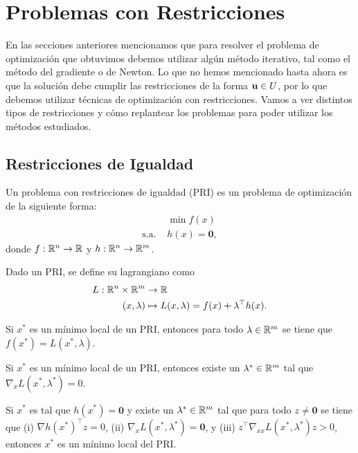 
\section{Problemas con Restricciones}

En las secciones anteriores mencionamos que para resolver el problema de optimización que obtuvimos debemos utilizar algún método iterativo, tal como el método del gradiente o de Newton. Lo que no hemos mencionado hasta ahora es que la solución debe cumplir las restricciones de la forma \(\mathbf{u} \in U\), por lo que debemos utilizar técnicas de optimización con restricciones. Vamos a ver distintos tipos de restricciones y cómo replantear los problemas para poder utilizar los métodos estudiados.

\subsection{Restricciones de Igualdad}

Un problema con restricciones de igualdad (PRI) es un problema de optimización de la siguiente forma:
\begin{align*}
					& \min f(x) \\
	\text{s.a. }	& h(x) = \mathbf{0},
\end{align*}
donde \(f : \mathbb{R}^{n} \to \mathbb{R}\) y \(h : \mathbb{R}^{n} \to \mathbb{R}^{m}\).

\begin{definition}
	Dado un PRI, se define su lagrangiano como
	\begin{align*}
		L : \mathbb{R}^n \times \mathbb{R}^m	&\to \mathbb{R}\\
		(x, \lambda)					&\mapsto L(x, \lambda) = f(x) + \lambda^{\top} h(x).
	\end{align*}
\end{definition}

\begin{proposition}
	Si \(x^{\ast}\) es un mínimo local de un PRI, entonces para todo \(\lambda \in \mathbb{R}^m\) se tiene que \(f(x^{\ast}) = L(x^{\ast}, \lambda)\).
\end{proposition}

\begin{proposition}
	Si \(x^{\ast}\) es un mínimo local de un PRI, entonces existe un \(\lambda^{\ast} \in \mathbb{R}^m\) tal que \(\nabla_{x} L(x^{\ast}, \lambda^{\ast}) = 0\).
\end{proposition}

\begin{proposition}
	Si \(x^{\ast}\) es tal que \(h(x^{\ast}) = \mathbf{0}\) y existe un \(\lambda^{\ast} \in \mathbb{R}^m\) tal que para todo \(z \neq \mathbf{0}\) se tiene que (i) \(\nabla h(x^{\ast})^\top z = 0\), (ii) \(\nabla_{x} L(x^{\ast}, \lambda^{\ast}) = \mathbf{0}\), y (iii) \(z^{\top} \nabla_{xx} L(x^{\ast}, \lambda^{\ast}) z > 0\), entonces \(x^{\ast}\) es un mínimo local del PRI.
\end{proposition}

